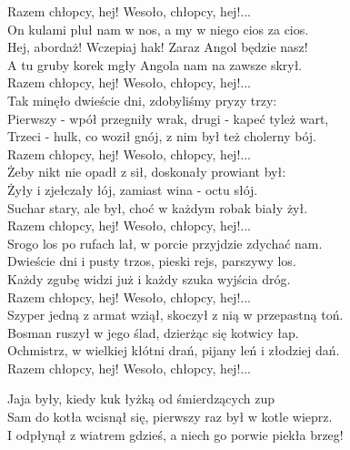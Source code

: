 Razem chłopcy, hej! Wesoło, chłopcy, hej!... \\

\newpage
On kulami pluł nam w nos, a my w niego cios za cios. \\
Hej, abordaż! Wczepiaj hak! Zaraz Angol będzie nasz! \\
A tu gruby korek mgły Angola nam na zawsze skrył. \\

Razem chłopcy, hej! Wesoło, chłopcy, hej!... \\

Tak minęło dwieście dni, zdobyliśmy pryzy trzy: \\
Pierwszy - wpół przegniły wrak, drugi - kapeć tyleż wart, \\
Trzeci - hulk, co woził gnój, z nim był też cholerny bój. \\

Razem chłopcy, hej! Wesoło, chłopcy, hej!... \\

Żeby nikt nie opadł z sił, doskonały prowiant był: \\
Żyły i zjełczały łój, zamiast wina - octu słój. \\
Suchar stary, ale był, choć w każdym robak biały żył. \\

Razem chłopcy, hej! Wesoło, chłopcy, hej!... \\

Srogo los po rufach lał, w porcie przyjdzie zdychać nam. \\
Dwieście dni i pusty trzos, pieski rejs, parszywy los. \\
Każdy zgubę widzi już i każdy szuka wyjścia dróg. \\

Razem chłopcy, hej! Wesoło, chłopcy, hej!... \\

Szyper jedną z armat wziął, skoczył z nią w przepastną toń. \\
Bosman ruszył w jego ślad, dzierżąc się kotwicy łap. \\
Ochmistrz, w wielkiej kłótni drań, pijany leń i złodziej dań. \\

Razem chłopcy, hej! Wesoło, chłopcy, hej!... \\
\newpage

Jaja były, kiedy kuk łyżką od śmierdzących zup \\
Sam do kotła wcisnął się, pierwszy raz był w kotle wieprz. \\
I odpłynął z wiatrem gdzieś, a niech go porwie piekła brzeg! \\

